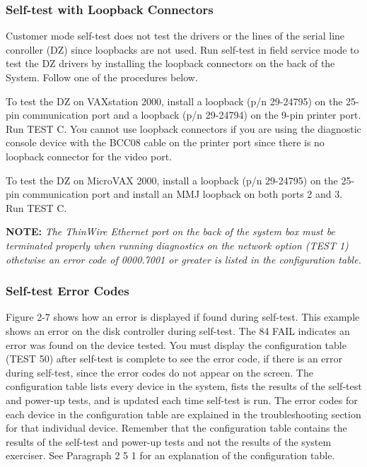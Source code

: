 \subsubsection{Self-test with Loopback Connectors}

Customer mode self-test does not test the drivers or the lines of the serial
line conroller (DZ) since loopbacks are not used. Run self-test in field 
service mode to test the DZ drivers by installing the loopback connectors on
the back of the System. Follow one of the procedures below.

To test the DZ on VAXstation 2000, install a loopback (p/n 29-24795) on
the 25-pin communication port and a loopback (p/n 29-24794) on the 9-pin
printer port. Run TEST C. You cannot use loopback connectors if you are
using the diagnostic console device with the BCC08 cable on the printer
port since there is no loopback connector for the video port.

To test the DZ on MicroVAX 2000, install a loopback (p/n 29-24795) on the
25-pin communication port and install an MMJ loopback on both ports 2
and 3. Run TEST C.

\textbf{NOTE:} \textit{The ThinWire Ethernet port on the back of the 
system box must be terminated properly when running diagnostics on the 
network option (TEST 1) othetwise an error code of 0000.7001 or greater 
is listed in the configuration table.}

\subsubsection{Self-test Error Codes}

Figure 2-7 shows how an error is displayed if found during self-test. This
example shows an error on the disk controller during self-test. The 84 FAIL
indicates an error was found on the device tested. You must display the
configuration table (TEST 50) after self-test is complete to see the error code,
if there is an error during self-test, since the error codes do not appear on
the screen. The configuration table lists every device in the system, fists the
results of the self-test and power-up tests, and is updated each time self-test
is run. The error codes for each device in the configuration table are 
explained in the troubleshooting section for that individual device. Remember
that the configuration table contains the results of the self-test and power-up
tests and not the results of the system exerciser. See Paragraph 2 5 1 for an
explanation of the configuration table.

